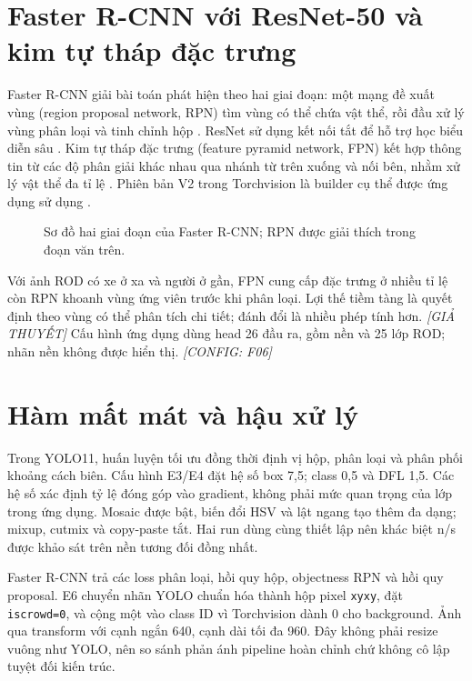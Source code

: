 \documentclass[12pt,a4paper,oneside]{report}
\newcommand{\configured}[1]{\textit{[CONFIG: #1]}}
\newcommand{\hypothesis}{\textit{[GIẢ THUYẾT]}}
\begin{document}
\section{Faster R-CNN với ResNet-50 và kim tự tháp đặc trưng}
Faster R-CNN giải bài toán phát hiện theo hai giai đoạn: một mạng đề xuất vùng (region proposal network, RPN) tìm vùng có thể chứa vật thể, rồi đầu xử lý vùng phân loại và tinh chỉnh hộp \cite{fasterrcnn}. ResNet sử dụng kết nối tắt để hỗ trợ học biểu diễn sâu \cite{resnet}. Kim tự tháp đặc trưng (feature pyramid network, FPN) kết hợp thông tin từ các độ phân giải khác nhau qua nhánh từ trên xuống và nối bên, nhằm xử lý vật thể đa tỉ lệ \cite{fpn}. Phiên bản V2 trong Torchvision là builder cụ thể được ứng dụng sử dụng \cite{torchvision}.

\begin{figure}[htbp]\centering
{}
\caption{Sơ đồ hai giai đoạn của Faster R-CNN; RPN được giải thích trong đoạn văn trên.}\end{figure}

Với ảnh ROD có xe ở xa và người ở gần, FPN cung cấp đặc trưng ở nhiều tỉ lệ còn RPN khoanh vùng ứng viên trước khi phân loại. Lợi thế tiềm tàng là quyết định theo vùng có thể phân tích chi tiết; đánh đổi là nhiều phép tính hơn. \hypothesis\; Cấu hình ứng dụng dùng head 26 đầu ra, gồm nền và 25 lớp ROD; nhãn nền không được hiển thị. \configured{F06}

\section{Hàm mất mát và hậu xử lý}
Trong YOLO11, huấn luyện tối ưu đồng thời định vị hộp, phân loại và phân phối khoảng cách biên. Cấu hình E3/E4 đặt hệ số box 7,5; class 0,5 và DFL 1,5. Các hệ số xác định tỷ lệ đóng góp vào gradient, không phải mức quan trọng của lớp trong ứng dụng. Mosaic được bật, biến đổi HSV và lật ngang tạo thêm đa dạng; mixup, cutmix và copy-paste tắt. Hai run dùng cùng thiết lập nên khác biệt n/s được khảo sát trên nền tương đối đồng nhất.

Faster R-CNN trả các loss phân loại, hồi quy hộp, objectness RPN và hồi quy proposal. E6 chuyển nhãn YOLO chuẩn hóa thành hộp pixel \texttt{xyxy}, đặt \texttt{iscrowd=0}, và cộng một vào class ID vì Torchvision dành 0 cho background. Ảnh qua transform với cạnh ngắn 640, cạnh dài tối đa 960. Đây không phải resize vuông như YOLO, nên so sánh phản ánh pipeline hoàn chỉnh chứ không cô lập tuyệt đối kiến trúc.
\end{document}
